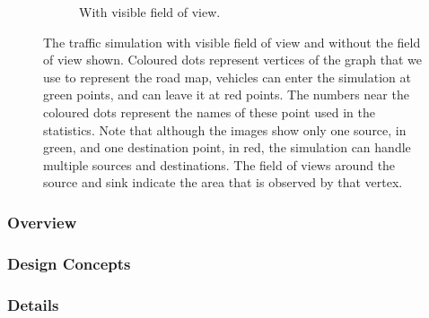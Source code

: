 \begin{figure}
\begin{subfigure}{0.49\textwidth}
		\caption{With visible field of view.}
		\label{fig:model:simulation:nofix}
	\end{subfigure}	
	\caption{The traffic simulation with  visible field of view and  without the field of view shown. Coloured dots represent vertices of the graph that we use to represent the road map, vehicles can enter the simulation at green points, and can leave it at red points. The numbers near the coloured dots represent the names of these point used in the statistics. Note that although the images show only one source, in green, and one destination point, in red, the simulation can handle multiple sources and destinations. The field of views around the source and sink indicate the area that is observed by that vertex.}
	\label{fig:model:simulation}
\end{figure}

\subsubsection{Overview}
\label{subsub:method:model:overview}


\subsubsection{Design Concepts}
\label{subsub:method:model:design}


\subsubsection{Details}
\label{subsub:method:model:details}
